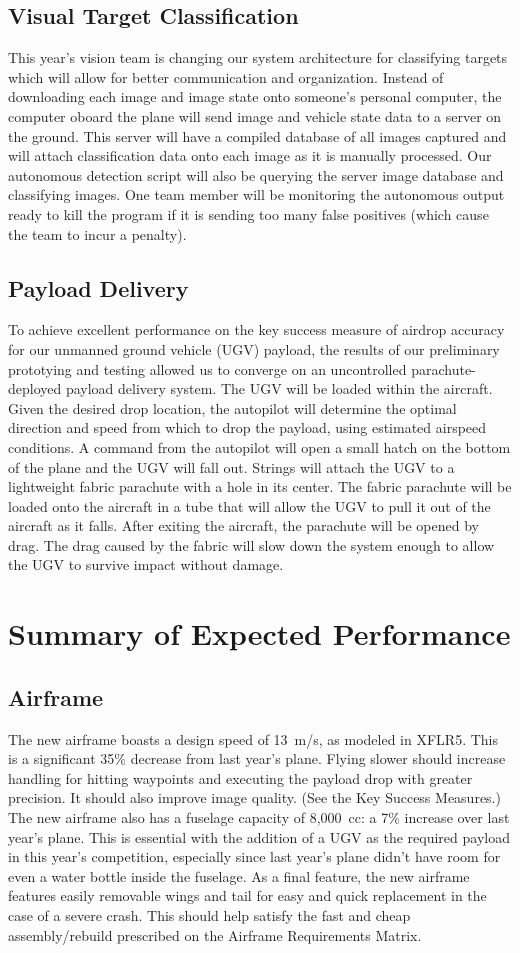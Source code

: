 \documentclass[]{auvsi_doc}
\begin{document}
\subsection{Visual Target Classification}
This year's vision team is changing our system architecture for classifying targets which will
allow for better communication and organization. Instead of downloading each image and image state
onto someone's personal computer, the computer oboard the plane will send image and vehicle state
data to a server on the ground. This server will have a compiled database of all images captured
and will attach classification data onto each image as it is manually processed. Our
autonomous detection script will also be querying the server image database and classifying
images. One team member will be monitoring the autonomous output ready to kill the
program if it is sending too many false positives (which cause the team to incur a
penalty).
\subsection{Payload Delivery}
To achieve excellent performance on the key success measure of airdrop accuracy for our unmanned ground vehicle (UGV) payload, the results of our preliminary prototying and testing allowed us to converge on an uncontrolled parachute-deployed payload delivery system. The UGV will be loaded within the aircraft. Given the desired drop location, the autopilot will determine the optimal direction and speed from which to drop the payload, using estimated airspeed conditions. A command from the autopilot will open a small hatch on the bottom of the plane and the UGV will fall out. Strings will attach the UGV to a lightweight fabric parachute with a hole in its center. The fabric parachute will be loaded onto the aircraft in a tube that will allow the UGV to pull it out of the aircraft as it falls. After exiting the aircraft, the parachute will be opened by drag. The drag caused by the fabric will slow down the system enough to allow the UGV to survive impact without damage.
\section{Summary of Expected Performance}
\subsection{Airframe}
The new airframe boasts a design speed of 13~m/s, as modeled in XFLR5. This is a significant 35\% decrease from last year's plane. Flying slower should increase handling for hitting waypoints and executing the payload drop with greater precision. It should also improve image quality. (See the Key Success Measures.) The new airframe also has a fuselage capacity of 8,000~cc: a 7\% increase over last year's plane. This is essential with the addition of a UGV as the required payload in this year's competition, especially since last year's plane didn't have room for even a water bottle inside the fuselage. As a final feature, the new airframe features easily removable wings and tail for easy and quick replacement in the case of a severe crash. This should help satisfy the fast and cheap assembly/rebuild prescribed on the Airframe Requirements Matrix.
\end{document}
